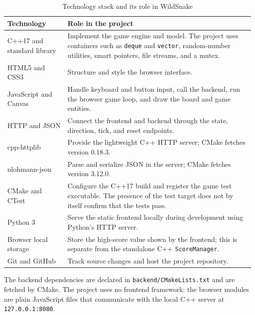 \documentclass[12pt,a4paper]{report}
\begin{document}
\begin{table}[H]
\centering
\caption{Technology stack and its role in WildSnake}
\label{tab:technology-stack}
\begin{tabular}{p{39mm}p{96mm}}
\toprule
Technology & Role in the project\\\midrule
C++17 and standard library & Implement the game engine and model. The project
uses containers such as \texttt{deque} and \texttt{vector}, random-number
utilities, smart pointers, file streams, and a mutex.\\
HTML5 and CSS3 & Structure and style the browser interface.\\
JavaScript and Canvas & Handle keyboard and button input, call the backend,
run the browser game loop, and draw the board and game entities.\\
HTTP and JSON & Connect the frontend and backend through the state, direction,
tick, and reset endpoints.\\
cpp-httplib & Provide the lightweight C++ HTTP server; CMake fetches version
0.18.3.\\
 nlohmann-json & Parse and serialize JSON in the server; CMake fetches version
3.12.0.\\
CMake and CTest & Configure the C++17 build and register the game test
executable. The presence of the test target does not by itself confirm that
the tests pass.\\
Python 3 & Serve the static frontend locally during development using Python's
HTTP server.\\
Browser local storage & Store the high-score value shown by the frontend;
this is separate from the standalone C++ \texttt{ScoreManager}.\\
Git and GitHub & Track source changes and host the project repository.\\
\bottomrule
\end{tabular}
\end{table}

The backend dependencies are declared in \texttt{backend/CMakeLists.txt} and
are fetched by CMake. The project uses no frontend framework: the browser
modules are plain JavaScript files that communicate with the local C++ server
at \texttt{127.0.0.1:8080}.
\end{document}
